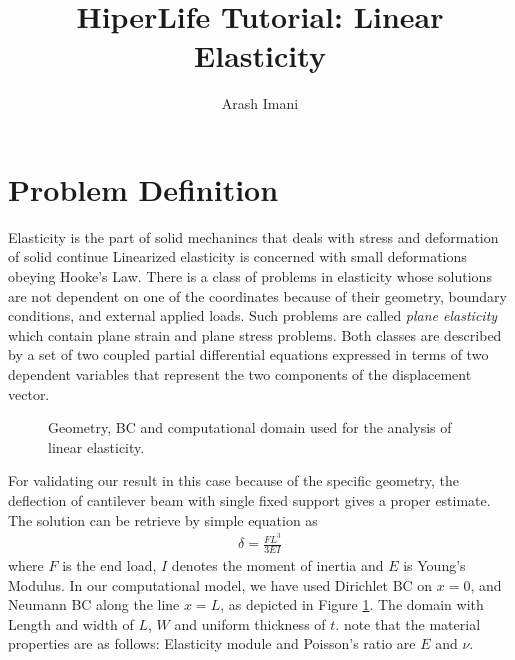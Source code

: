 \documentclass[]{article}
\begin{document}
\title{HiperLife Tutorial: Linear Elasticity}
\author{Arash Imani}
\maketitle

\linenumbers
\section{Problem Definition} \label{sec: pd}
Elasticity is the part of solid mechanincs that deals with stress and deformation of solid continue Linearized elasticity is concerned with small deformations obeying Hooke's Law. There is a class of problems in elasticity whose solutions are not dependent on one of the coordinates because of their geometry, boundary conditions, and external applied loads. Such problems are called \textit{plane elasticity} which contain plane strain and plane stress problems. Both classes are described by a set of two coupled partial differential equations expressed in terms of two dependent variables that represent the two components of the displacement vector.
\begin{figure}[htbp]
	\centering
	
	\caption{Geometry, BC and computational domain used for the analysis of linear elasticity.}
	\label{fig_SB}
\end{figure}

For validating our result in this case because of the specific geometry, the deflection of cantilever beam with single fixed support gives a proper estimate. The solution can be retrieve by simple equation as 
\begin{equation}\label{eq1}
	\begin{aligned}
		\delta = \frac{FL^3}{3EI}
	\end{aligned}
\end{equation}
where $F$ is the end load, $I$ denotes the moment of inertia and $E$ is Young's Modulus. In our computational model, we have used Dirichlet BC on $x=0$, and Neumann BC along the line $x=L$, as depicted in Figure \ref{fig_SB}. The domain with Length and width of $L$, $W$ and uniform thickness of $t$. note that the material properties are as follows: Elasticity module and Poisson's ratio are $E$ and $\nu$.
\end{document}
